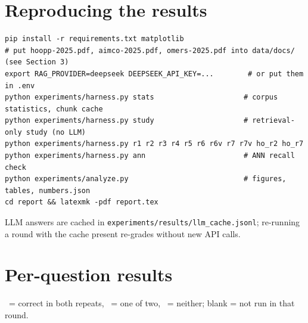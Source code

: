 \documentclass[11pt,a4paper]{article}
\newcommand{\cmark}{\textcolor{c3}{\ding{51}}}
\newcommand{\xmark}{\textcolor{c2}{\ding{55}}}
\newcommand{\hmark}{\textcolor{ink2}{\textonehalf}}
\begin{document}
\section{Reproducing the results}
\begin{lstlisting}
pip install -r requirements.txt matplotlib
# put hoopp-2025.pdf, aimco-2025.pdf, omers-2025.pdf into data/docs/ (see Section 3)
export RAG_PROVIDER=deepseek DEEPSEEK_API_KEY=...        # or put them in .env
python experiments/harness.py stats                     # corpus statistics, chunk cache
python experiments/harness.py study                     # retrieval-only study (no LLM)
python experiments/harness.py r1 r2 r3 r4 r5 r6 r6v r7 r7v ho_r2 ho_r7
python experiments/harness.py ann                       # ANN recall check
python experiments/analyze.py                           # figures, tables, numbers.json
cd report && latexmk -pdf report.tex
\end{lstlisting}
LLM answers are cached in \texttt{experiments/results/llm\_cache.jsonl}; re-running a round with the cache present
re-grades without new API calls.

\section{Per-question results}
\label{app:perq}
\cmark\ = correct in both repeats, \hmark\ = one of two, \xmark\ = neither; blank = not run in that round.
{\small

}
\end{document}

